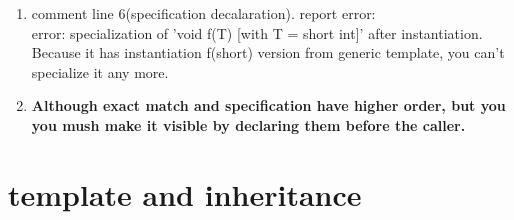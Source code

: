 \documentclass[a4paper,11pt,twoside]{book}
\begin{document}
\begin{itemize}
\begin{enumerate}
\begin{enumerate}
	\item comment line 6(specification decalaration). report error:\\
	error: specialization of 'void f(T) [with T = short int]' after instantiation.
	Because it has instantiation f(short) version from generic template, you can't specialize it any more.
	 
	\item \textbf{Although exact match and specification have higher order, but you you mush make it visible by declaring them before the caller.}
\end{enumerate}

\end{enumerate}

\end{itemize}


\section{template and inheritance}
\end{document}
